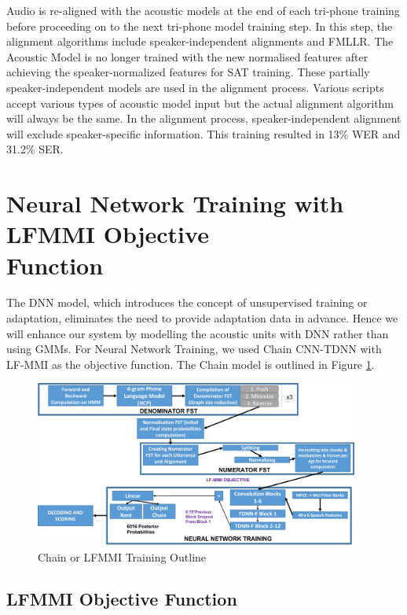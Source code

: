Audio is re-aligned with the acoustic models at the end of each tri-phone training before proceeding on to the next tri-phone model training step. In this step, the alignment algorithms include speaker-independent alignments and FMLLR. The Acoustic Model is no longer trained with the new normalised features after achieving the speaker-normalized features for SAT training. These partially speaker-independent models are used in the alignment process. Various scripts accept various types of acoustic model input but the actual alignment algorithm will always be the same. In the alignment process, speaker-independent alignment will exclude speaker-specific information. This training resulted in 13\% WER and 31.2\% SER.

\section{Neural Network Training with LFMMI Objective \\ Function}
\label{sec:LFMMI-chain}
The DNN model, which introduces the concept of unsupervised training or adaptation, eliminates the need to provide adaptation data in advance. Hence we will enhance our system by modelling the acoustic units with DNN rather than using GMMs. For Neural Network Training, we used Chain CNN-TDNN with LF-MMI as the objective function. The Chain model is outlined in Figure \ref{fig:Chain-Training-outline}.

\begin{figure}[h]
    \centering
    \includegraphics[width=0.95\textwidth]{img/ChainModel-Detail.png}
    \caption{Chain or LFMMI Training Outline}
    \label{fig:Chain-Training-outline}
\end{figure}
 

\subsection{LFMMI Objective Function}

